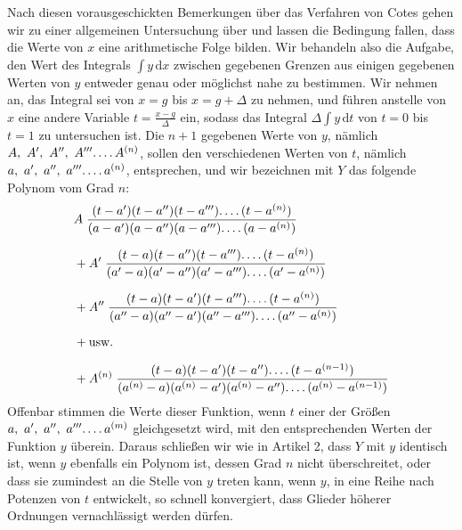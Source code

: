 
Nach diesen vorausgeschickten Bemerkungen über das Verfahren von Cotes gehen wir zu einer allgemeinen Untersuchung über und lassen die Bedingung fallen, dass die Werte von $x$ eine arithmetische Folge bilden. Wir behandeln also die Aufgabe, den Wert des Integrals $\int y\,\mathrm{d}x$ zwischen gegebenen Grenzen aus einigen gegebenen Werten von $y$ entweder genau oder möglichst nahe zu bestimmen. Wir nehmen an, das Integral sei von $x=g$ bis $x=g+\Delta$ zu nehmen, und führen anstelle von $x$ eine andere Variable $t=\frac{x-g}{\Delta}$ ein, sodass das Integral $\Delta\int y\,\mathrm{d}t$ von $t=0$ bis $t=1$ zu untersuchen ist. Die $n+1$ gegebenen Werte von $y$, nämlich $A,\ A',\ A'',\ A'''\ldotp\ldotp\ldotp\ldotp A^{(n)}$, sollen den verschiedenen Werten von $t$, nämlich $a,\ a',\ a'',\ a'''\ldotp\ldotp\ldotp\ldotp a^{(n)}$, entsprechen, und wir bezeichnen mit $Y$ das folgende Polynom vom Grad $n$:
\[
\begin{aligned}
& A\;\frac{(t-a')(t-a'')(t-a''')\ldotp\ldotp\ldotp\ldotp(t-a^{(n)})}
{(a-a')(a-a'')(a-a''')\ldotp\ldotp\ldotp\ldotp(a-a^{(n)})}\\[6pt]
&{}+A'\;\frac{(t-a)(t-a'')(t-a''')\ldotp\ldotp\ldotp\ldotp(t-a^{(n)})}
{(a'-a)(a'-a'')(a'-a''')\ldotp\ldotp\ldotp\ldotp(a'-a^{(n)})}\\[6pt]
&{}+A''\;\frac{(t-a)(t-a')(t-a''')\ldotp\ldotp\ldotp\ldotp(t-a^{(n)})}
{(a''-a)(a''-a')(a''-a''')\ldotp\ldotp\ldotp\ldotp(a''-a^{(n)})}\\[6pt]
&{}+\text{usw.}\\[6pt]
&{}+A^{(n)}\;\frac{(t-a)(t-a')(t-a'')\ldotp\ldotp\ldotp\ldotp(t-a^{(n-1)})}
{(a^{(n)}-a)(a^{(n)}-a')(a^{(n)}-a'')\ldotp\ldotp\ldotp\ldotp(a^{(n)}-a^{(n-1)})}
\end{aligned}
\]
Offenbar stimmen die Werte dieser Funktion, wenn $t$ einer der Größen $a,\allowbreak \ a',\allowbreak \ a'',\allowbreak \ a'''\ldotp\ldotp\ldotp\ldotp a^{(m)}$ gleichgesetzt wird, mit den entsprechenden Werten der Funktion $y$ überein. Daraus schließen wir wie in Artikel 2, dass $Y$ mit $y$ identisch ist, wenn $y$ ebenfalls ein Polynom ist, dessen Grad $n$ nicht überschreitet, oder dass sie zumindest an die Stelle von $y$ treten kann, wenn $y$, in eine Reihe nach Potenzen von $t$ entwickelt, so schnell konvergiert, dass Glieder höherer Ordnungen vernachlässigt werden dürfen.


